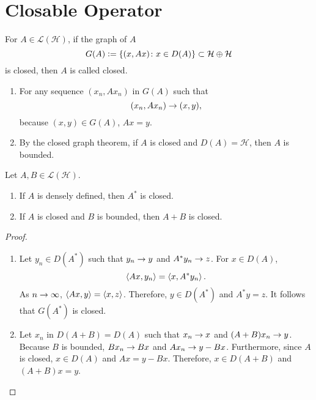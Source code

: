 \documentclass[a4paper,12pt]{article}
\begin{document}
\section{Closable Operator}

\begin{defn}
    For $A \in \mathcal{L}(\mathcal{H})$, if the graph of $A$
    \begin{equation*}
        G(A) \vcentcolon= \left\{(x,Ax) \colon x \in D(A)\right\} \subset \mathcal{H} \oplus \mathcal{H}
    \end{equation*}
    is closed, then $A$ is called closed.
\end{defn}
\begin{rmk}
    \begin{enumerate}[label=(\arabic*)]
        \item For any sequence $(x_n,Ax_n)$ in $G(A)$ such that
        \begin{equation*}
            (x_n,Ax_n) \rightarrow (x,y),
        \end{equation*}
        because $(x,y) \in G(A)$, $Ax = y$.

        \item By the closed graph theorem, if $A$ is closed and $D(A) = \mathcal{H}$, then $A$ is bounded.
    \end{enumerate}
\end{rmk}

\begin{prop}
    Let $A,B \in \mathcal{L}(\mathcal{H})$.
    \begin{enumerate}[label=(\arabic{*})]
        \item If $A$ is densely defined, then $A^*$ is closed.

        \item If $A$ is closed and $B$ is bounded, then $A + B$ is closed.
    \end{enumerate}
\end{prop}
\begin{proof}
    \begin{enumerate}[label=(\arabic*)]
        \item Let $y_n \in D(A^*)$ such that $y_n \rightarrow y$ and $A^*y_n \rightarrow z$. For $x \in D(A)$,
        \begin{equation*}
            \left\langle Ax,y_n \right\rangle = \left\langle x,A^*y_n \right\rangle.
        \end{equation*}
        As $n \rightarrow \infty$, $\left\langle Ax,y \right\rangle = \left\langle x,z \right\rangle$. Therefore, $y \in D(A^*)$ and $A^*y = z$. It follows that $G(A^*)$ is closed.

        \item Let $x_n$ in $D(A+B) = D(A)$ such that $x_n \rightarrow x$ and $(A+B)x_n \rightarrow y$. Because $B$ is bounded, $Bx_n \rightarrow Bx$ and $Ax_n \rightarrow y - Bx$. Furthermore, since $A$ is closed, $x \in D(A)$ and $Ax = y - Bx$. Therefore, $x \in D(A+B)$ and $(A+B)x = y$.
    \end{enumerate}
\end{proof}
\end{document}

